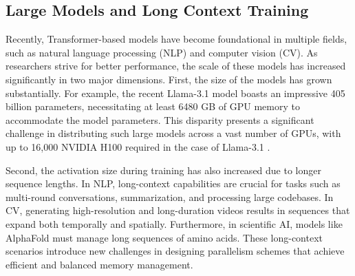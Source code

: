 \documentclass[sigplan,screen]{acmart}
\begin{document}
\subsection{Large Models and Long Context Training}
Recently, Transformer-based models \cite{vaswani2023attention, brown2020language, devlin2018bert, touvron2023llama, peebles2023scalablediffusionmodelstransformers, dosovitskiy2021vit} have become foundational in multiple fields, such as natural language processing (NLP) and computer vision (CV). As researchers strive for better performance, the scale of these models has increased significantly in two major dimensions. First, the size of the models has grown substantially. For example, the recent Llama-3.1 model \cite{dubey2024llama3herdmodels} boasts an impressive 405 billion parameters, necessitating at least 6480 GB of GPU memory to accommodate the model parameters. This disparity presents a significant challenge in distributing such large models across a vast number of GPUs, with up to 16,000 NVIDIA H100 required in the case of Llama-3.1 \cite{dubey2024llama3herdmodels}.

Second, the activation size during training has also increased due to longer sequence lengths. In NLP, long-context capabilities are crucial for tasks such as multi-round conversations\cite{openai2023gpt4}, summarization\cite{Koh2022AnES, beltagy2020longformer}, and processing large codebases\cite{li2023starcodersourceyou, rozière2024codellamaopenfoundation, chowdhery2022palmscalinglanguagemodeling}. In CV, generating high-resolution and long-duration videos\cite{Brooks_2024, peebles2023scalable} results in sequences that expand both temporally and spatially. Furthermore, in scientific AI, models like AlphaFold \cite{Jumper2021Alphafold, cheng2023fastfold} must manage long sequences of amino acids. These long-context scenarios introduce new challenges in designing parallelism schemes that achieve efficient and balanced memory management.
\end{document}
